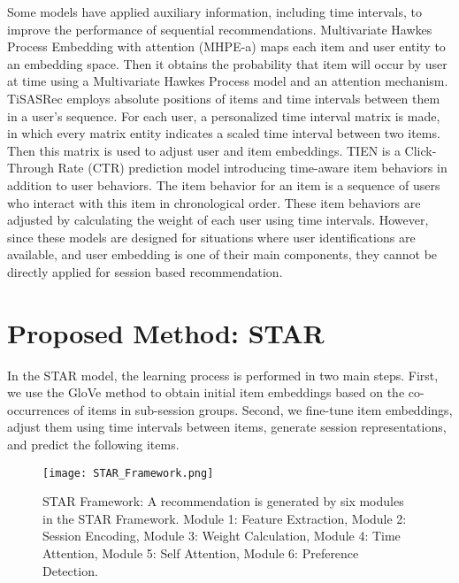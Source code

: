 \documentclass[3p, preprint, times]{elsarticle}
\begin{document}
Some models have applied auxiliary information, including time intervals, to improve the performance of sequential recommendations. Multivariate Hawkes Process Embedding with attention (MHPE-a) \cite{wang2021sequential} maps each item and user entity to an embedding space. Then it obtains the probability that item  will occur by user  at time  using a Multivariate Hawkes Process model and an attention mechanism. TiSASRec \cite{li2020time} employs absolute positions of items and time intervals between them in a user's sequence. For each user, a personalized time interval matrix is made, in which every matrix entity indicates a scaled time interval between two items. Then this matrix is used to adjust user and item embeddings. TIEN \cite{li2020deep} is a Click-Through Rate (CTR) prediction model introducing time-aware item behaviors in addition to user behaviors. The item behavior for an item is a sequence of users who interact with this item in chronological order. These item behaviors are adjusted by calculating the weight of each user using time intervals. However, since these models are designed for situations where user identifications are available, and user embedding is one of their main components, they cannot be directly applied for session based recommendation.


\section{Proposed Method: STAR}\label{sec:proposedModel}

In the STAR model, the learning process is performed in two main steps. First, we use the GloVe method \cite{pennington2014glove} to obtain initial item embeddings based on the co-occurrences of items in sub-session groups. Second, we fine-tune item embeddings, adjust them using time intervals between items, generate session representations, and predict the following items.

\begin{figure*}[t]
    \begin{center}
        \texttt{[image: STAR\_Framework.png]}
        \caption{STAR Framework: A recommendation is generated by six modules in the STAR Framework. Module 1: Feature Extraction, Module 2: Session Encoding, Module 3: Weight Calculation,
        Module 4: Time Attention, Module 5: Self Attention, Module 6: Preference Detection.}
        \label{fig:STAR_framwork}
    
    \end{center}
\end{figure*}
\end{document}

